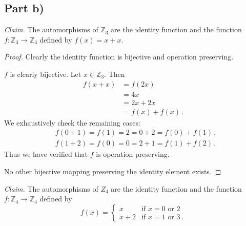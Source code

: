\documentclass{abrice}
\newcommand{\Z}{\mathbb{Z}}
\newcommand{\Claim}{\emph{Claim.}\xspace}%
\begin{document}
\subsection{Part b)}

\Claim The automorphisms of $\Z_3$ are the identity function and the function $f : \Z_3
\to \Z_3$ defined by $f(x) = x + x$.

\begin{proof}
  Clearly the identity function is bijective and operation preserving.

  $f$ is clearly bijective. Let $x \in \Z_3$. Then
  \begin{align*}
    f(x + x)
    &= f(2x) \\
    &= 4x \\
    &= 2x + 2x \\
    &= f(x) + f(x)\, .
  \end{align*}
  We exhaustively check the remaining cases:
  \begin{align*}
    &f(0 + 1) = f(1) = 2 = 0 + 2 = f(0) + f(1)\, , \\
    & f(1 + 2) = f(0) = 0 = 2 + 1 = f(1) + f(2)\, .
  \end{align*}
  Thus we have verified that $f$ is operation preserving.

  No other bijective mapping preserving the identity element exists.
\end{proof}

\noindent
\Claim The automorphisms of $Z_4$ are the identity function and the function $f
: \Z_4 \to \Z_4$ defined by
\[
  f(x) =
  \begin{cases}
    x &\text{if } x = 0 \text{ or } 2\\
    x + 2 &\text{if } x = 1 \text{ or } 3\, .
  \end{cases}
\]
\end{document}
